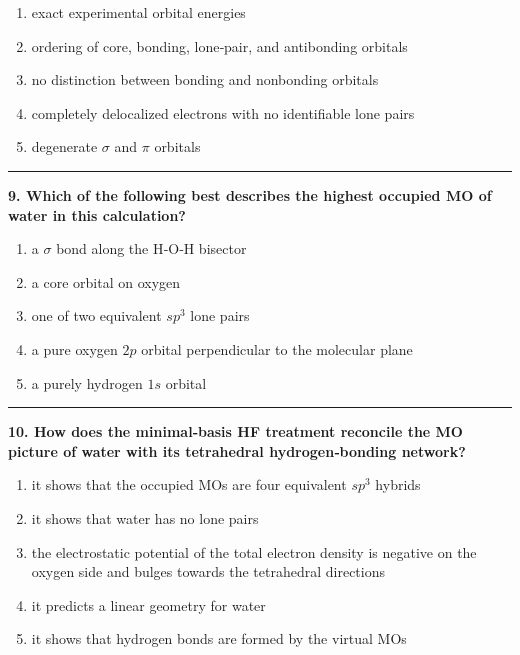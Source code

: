 \documentclass[
  english,
  9pt,
]{extbook}
\providecommand{\tightlist}{%
  \setlength{\itemsep}{0pt}\setlength{\parskip}{0pt}}
\theoremstyle{definition}
\theoremstyle{definition}
\theoremstyle{definition}
\theoremstyle{definition}
\theoremstyle{remark}
\begin{document}
\begin{enumerate}
\def\labelenumi{\alph{enumi}.}
\tightlist
\item
  exact experimental orbital energies\\
\item
  ordering of core, bonding, lone‑pair, and antibonding orbitals\\
\item
  no distinction between bonding and nonbonding orbitals\\
\item
  completely delocalized electrons with no identifiable lone pairs\\
\item
  degenerate \(\sigma\) and \(\pi\) orbitals
\end{enumerate}

\begin{center}\rule{0.5\linewidth}{0.5pt}\end{center}

\textbf{9. Which of the following best describes the highest occupied MO of water in this calculation?}

\begin{enumerate}
\def\labelenumi{\alph{enumi}.}
\tightlist
\item
  a \(\sigma\) bond along the H‑O‑H bisector\\
\item
  a core orbital on oxygen\\
\item
  one of two equivalent \(sp^3\) lone pairs\\
\item
  a pure oxygen \(2p\) orbital perpendicular to the molecular plane\\
\item
  a purely hydrogen \(1s\) orbital
\end{enumerate}

\begin{center}\rule{0.5\linewidth}{0.5pt}\end{center}

\textbf{10. How does the minimal‑basis HF treatment reconcile the MO picture of water with its tetrahedral hydrogen‑bonding network?}

\begin{enumerate}
\def\labelenumi{\alph{enumi}.}
\tightlist
\item
  it shows that the occupied MOs are four equivalent \(sp^3\) hybrids\\
\item
  it shows that water has no lone pairs\\
\item
  the electrostatic potential of the total electron density is negative on the oxygen side and bulges towards the tetrahedral directions\\
\item
  it predicts a linear geometry for water\\
\item
  it shows that hydrogen bonds are formed by the virtual MOs
\end{enumerate}
\end{document}
